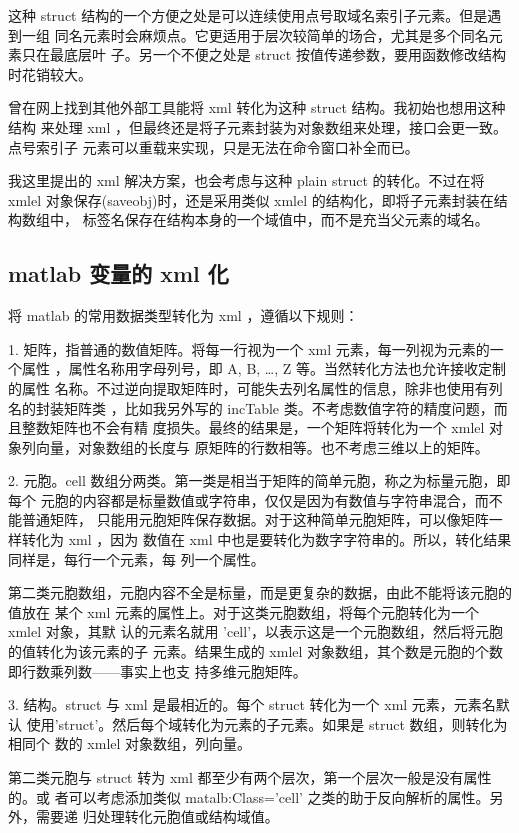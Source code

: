 这种 struct 结构的一个方便之处是可以连续使用点号取域名索引子元素。但是遇到一组
同名元素时会麻烦点。它更适用于层次较简单的场合，尤其是多个同名元素只在最底层叶
子。另一个不便之处是 struct 按值传递参数，要用函数修改结构时花销较大。

曾在网上找到其他外部工具能将 xml 转化为这种 struct 结构。我初始也想用这种结构
来处理 xml ，但最终还是将子元素封装为对象数组来处理，接口会更一致。点号索引子
元素可以重载来实现，只是无法在命令窗口补全而已。

我这里提出的 xml 解决方案，也会考虑与这种 plain struct 的转化。不过在将 xmlel
对象保存(saveobj)时，还是采用类似 xmlel 的结构化，即将子元素封装在结构数组中，
标签名保存在结构本身的一个域值中，而不是充当父元素的域名。

\subsection{matlab 变量的 xml 化}

将 matlab 的常用数据类型转化为 xml ，遵循以下规则：

1. 矩阵，指普通的数值矩阵。将每一行视为一个 xml 元素，每一列视为元素的一个属性
，属性名称用字母列号，即 A, B, \ldots , Z 等。当然转化方法也允许接收定制的属性
名称。不过逆向提取矩阵时，可能失去列名属性的信息，除非也使用有列名的封装矩阵类
，比如我另外写的 incTable 类。不考虑数值字符的精度问题，而且整数矩阵也不会有精
度损失。最终的结果是，一个矩阵将转化为一个 xmlel 对象列向量，对象数组的长度与
原矩阵的行数相等。也不考虑三维以上的矩阵。

2. 元胞。cell 数组分两类。第一类是相当于矩阵的简单元胞，称之为标量元胞，即每个
元胞的内容都是标量数值或字符串，仅仅是因为有数值与字符串混合，而不能普通矩阵，
只能用元胞矩阵保存数据。对于这种简单元胞矩阵，可以像矩阵一样转化为 xml ，因为
数值在 xml 中也是要转化为数字字符串的。所以，转化结果同样是，每行一个元素，每
列一个属性。

第二类元胞数组，元胞内容不全是标量，而是更复杂的数据，由此不能将该元胞的值放在
某个 xml 元素的属性上。对于这类元胞数组，将每个元胞转化为一个 xmlel 对象，其默
认的元素名就用 'cell'，以表示这是一个元胞数组，然后将元胞的值转化为该元素的子
元素。结果生成的 xmlel 对象数组，其个数是元胞的个数即行数乘列数——事实上也支
持多维元胞矩阵。

3. 结构。struct 与 xml 是最相近的。每个 struct 转化为一个 xml 元素，元素名默认
使用'struct'。然后每个域转化为元素的子元素。如果是 struct 数组，则转化为相同个
数的 xmlel 对象数组，列向量。

第二类元胞与 struct 转为 xml 都至少有两个层次，第一个层次一般是没有属性的。或
者可以考虑添加类似 matalb:Class='cell' 之类的助于反向解析的属性。另外，需要递
归处理转化元胞值或结构域值。

